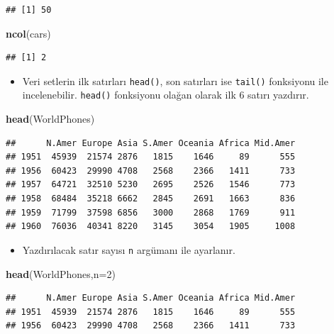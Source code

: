 \documentclass[
  oneside]{book}
\newenvironment{Shaded}{\begin{snugshade}}{\end{snugshade}}
\newcommand{\AttributeTok}[1]{\textcolor[rgb]{0.13,0.29,0.53}{#1}}
\newcommand{\DecValTok}[1]{\textcolor[rgb]{0.00,0.00,0.81}{#1}}
\newcommand{\FunctionTok}[1]{\textcolor[rgb]{0.13,0.29,0.53}{\textbf{#1}}}
\newcommand{\NormalTok}[1]{#1}
\providecommand{\tightlist}{%
  \setlength{\itemsep}{0pt}\setlength{\parskip}{0pt}}
\begin{document}
\begin{verbatim}
## [1] 50
\end{verbatim}

\begin{Shaded}
\begin{Highlighting}[]
\FunctionTok{ncol}\NormalTok{(cars)}
\end{Highlighting}
\end{Shaded}

\begin{verbatim}
## [1] 2
\end{verbatim}

\begin{itemize}
\tightlist
\item
  Veri setlerin ilk satırları \texttt{head()}, son satırları ise \texttt{tail()} fonksiyonu ile incelenebilir. \texttt{head()} fonksiyonu olağan olarak ilk 6 satırı yazdırır.
\end{itemize}

\begin{Shaded}
\begin{Highlighting}[]
\FunctionTok{head}\NormalTok{(WorldPhones)}
\end{Highlighting}
\end{Shaded}

\begin{verbatim}
##      N.Amer Europe Asia S.Amer Oceania Africa Mid.Amer
## 1951  45939  21574 2876   1815    1646     89      555
## 1956  60423  29990 4708   2568    2366   1411      733
## 1957  64721  32510 5230   2695    2526   1546      773
## 1958  68484  35218 6662   2845    2691   1663      836
## 1959  71799  37598 6856   3000    2868   1769      911
## 1960  76036  40341 8220   3145    3054   1905     1008
\end{verbatim}

\begin{itemize}
\tightlist
\item
  Yazdırılacak satır sayısı \texttt{n} argümanı ile ayarlanır.
\end{itemize}

\begin{Shaded}
\begin{Highlighting}[]
\FunctionTok{head}\NormalTok{(WorldPhones,}\AttributeTok{n=}\DecValTok{2}\NormalTok{)}
\end{Highlighting}
\end{Shaded}

\begin{verbatim}
##      N.Amer Europe Asia S.Amer Oceania Africa Mid.Amer
## 1951  45939  21574 2876   1815    1646     89      555
## 1956  60423  29990 4708   2568    2366   1411      733
\end{verbatim}
\end{document}

